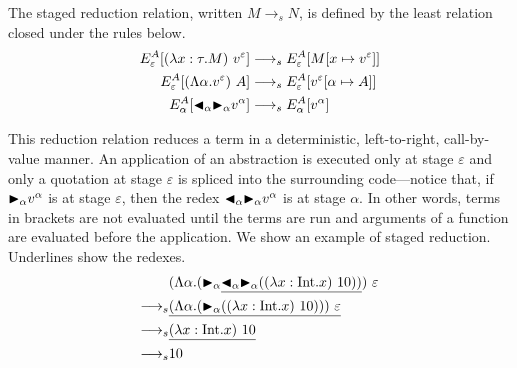\begin{definition}\sloppy
  The staged reduction relation, written $M \longrightarrow_s N$, is defined by
  the least relation closed under the rules below.
  \begin{align*}
    E^A_\varepsilon [(\lambda x:\tau.M)\ v^\varepsilon] & \longrightarrow_s E^A_\varepsilon[M[x\mapsto v^\varepsilon]]      \\
    E^A_\varepsilon [(\Lambda\alpha.v^\varepsilon)\ A]  & \longrightarrow_s E^A_\varepsilon[v^\varepsilon[\alpha\mapsto A]] \\
    E^A_\alpha [{\mathop{\blacktriangleleft}}_\alpha {\mathop{\blacktriangleright}}_\alpha v^\alpha]        & \longrightarrow_s E^A_\alpha[v^\alpha]                            \\
  \end{align*}
\end{definition}

This reduction relation reduces a term in a deterministic,
left-to-right, call-by-value manner.  An application of an abstraction
is executed only at stage \(\varepsilon\) and only a quotation at
stage \(\varepsilon\) is spliced into the surrounding code---notice
that, if \({\mathop{\blacktriangleright}}_\alpha v^\alpha\) is at stage \(\varepsilon\), then the
redex \({\mathop{\blacktriangleleft}}_\alpha {\mathop{\blacktriangleright}}_\alpha v^\alpha\) is at stage \(\alpha\).
In other words, terms in brackets are not evaluated until the terms are run
and arguments of a function are evaluated before the application.
We show an example of staged reduction.
Underlines show the redexes.
\begin{align*}
                    & (\Lambda\alpha.(\TB_\alpha \underline{\TBL_\alpha \TB_\alpha ((\lambda x:\I.x)\ 10))})\ \varepsilon \\
  \longrightarrow_s & \underline{(\Lambda\alpha.(\TB_\alpha ((\lambda x:\I.x)\ 10)))\ \varepsilon}                        \\
  \longrightarrow_s & \underline{(\lambda x:\I.x)\ 10}                                                                    \\
  \longrightarrow_s & 10
\end{align*}
